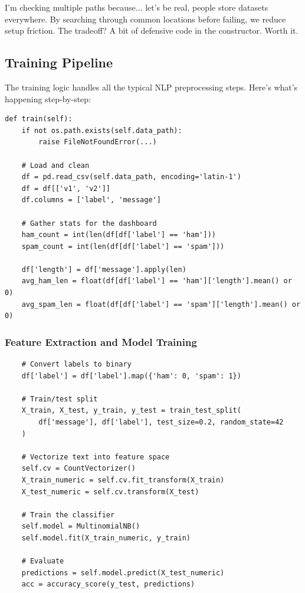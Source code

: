 \documentclass[12pt, a4paper]{article}
\begin{document}
\begin{devnote}
I'm checking multiple paths because... let's be real, people store datasets everywhere. By searching through common locations before failing, we reduce setup friction. The tradeoff? A bit of defensive code in the constructor. Worth it.
\end{devnote}

\subsection{Training Pipeline}

The training logic handles all the typical NLP preprocessing steps. Here's what's happening step-by-step:

\begin{verbatim}
def train(self):
    if not os.path.exists(self.data_path):
        raise FileNotFoundError(...)
    
    # Load and clean
    df = pd.read_csv(self.data_path, encoding='latin-1')
    df = df[['v1', 'v2']]
    df.columns = ['label', 'message']
    
    # Gather stats for the dashboard
    ham_count = int(len(df[df['label'] == 'ham']))
    spam_count = int(len(df[df['label'] == 'spam']))
    
    df['length'] = df['message'].apply(len)
    avg_ham_len = float(df[df['label'] == 'ham']['length'].mean() or 0)
    avg_spam_len = float(df[df['label'] == 'spam']['length'].mean() or 0)
\end{verbatim}

\subsubsection{Feature Extraction and Model Training}

\begin{verbatim}
    # Convert labels to binary
    df['label'] = df['label'].map({'ham': 0, 'spam': 1})
    
    # Train/test split
    X_train, X_test, y_train, y_test = train_test_split(
        df['message'], df['label'], test_size=0.2, random_state=42
    )
    
    # Vectorize text into feature space
    self.cv = CountVectorizer()
    X_train_numeric = self.cv.fit_transform(X_train)
    X_test_numeric = self.cv.transform(X_test)
    
    # Train the classifier
    self.model = MultinomialNB()
    self.model.fit(X_train_numeric, y_train)
    
    # Evaluate
    predictions = self.model.predict(X_test_numeric)
    acc = accuracy_score(y_test, predictions)
\end{verbatim}
\end{document}
